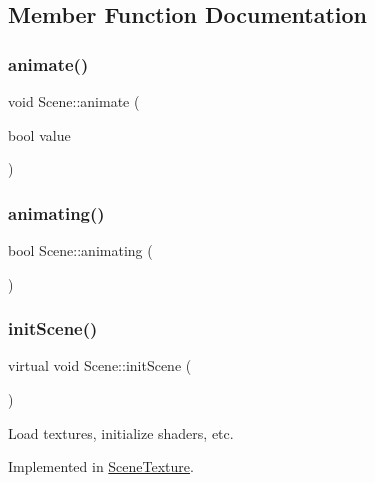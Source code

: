 \subsection{Member Function Documentation}
\mbox{\label{class_scene_a676f7cbc5f768869e9e5f318b1bc5730}} 
\subsubsection{\texorpdfstring{animate()}{animate()}}
{\footnotesize\ttfamily void Scene\+::animate (\begin{DoxyParamCaption}\item[{bool}]{value }\end{DoxyParamCaption})\hspace{0.3cm}{\ttfamily [inline]}}

\mbox{\label{class_scene_a72325333f1f2062afc3477b0e325ebec}} 
\subsubsection{\texorpdfstring{animating()}{animating()}}
{\footnotesize\ttfamily bool Scene\+::animating (\begin{DoxyParamCaption}{ }\end{DoxyParamCaption})\hspace{0.3cm}{\ttfamily [inline]}}

\mbox{\label{class_scene_ae76b830c1156bb40bd744afb63776be2}} 
\subsubsection{\texorpdfstring{initScene()}{initScene()}}
{\footnotesize\ttfamily virtual void Scene\+::init\+Scene (\begin{DoxyParamCaption}{ }\end{DoxyParamCaption})\hspace{0.3cm}{\ttfamily [pure virtual]}}

Load textures, initialize shaders, etc. 

Implemented in \mbox{\hyperlink{class_scene_texture_a22fb3251dd146c10643ca0af54b10bd5}{Scene\+Texture}}.

